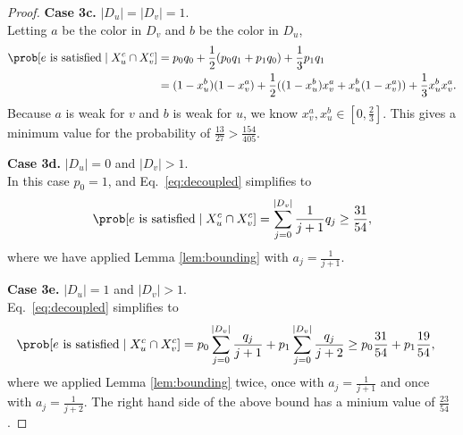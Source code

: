 \begin{proof}
	\bigbreak

	\noindent
	\textbf{Case 3c.} $|D_u| = |D_v| = 1$. \\
	Letting $a$ be the color in $D_v$ and $b$ be the color in $D_u$,
	\begin{align*}
		\prob[ e \text{ is satisfied} \mid X_u^c \cap X_v^c ] & = p_0 q_0 + \frac{1}{2}(p_0 q_1 + p_1 q_0) + \frac{1}{3} p_1 q_1 \\ &= (1 - x_u^b)(1 - x_v^a) + \frac{1}{2}((1 - x_u^b)x_v^a + x_u^b(1 - x_v^a)) + \frac{1}{3} x_u^b x_v^a.
	\end{align*}
	Because $a$ is weak for $v$ and $b$ is weak for $u$, we know $x_v^a, x_u^b \in [0, \frac{2}{3}]$. This gives a minimum value for the probability of $\frac{13}{27} > \frac{154}{405}$.

	\bigbreak

	\noindent
	\textbf{Case 3d.} $|D_u| = 0$ and $|D_v| > 1$. \\
	In this case $p_0 = 1$, and Eq.~\eqref{eq:decoupled} simplifies to
	\begin{equation*}
		\prob[ e \text{ is satisfied} \mid X_u^c \cap X_v^c ] = \sum_{j = 0}^{|D_v|} \frac{1}{j+1} q_j \geq \frac{31}{54},
	\end{equation*}
	where we have applied Lemma \ref{lem:bounding} with $a_j = \frac{1}{j+1}$.

	\bigbreak

	\noindent
	\textbf{Case 3e.} $|D_u| = 1$ and $|D_v| > 1$. \\
	Eq.~\eqref{eq:decoupled} simplifies to
	\begin{align*}
		\prob[ e \text{ is satisfied} \mid X_u^c \cap X_v^c ] & = p_0 \sum_{j = 0}^{|D_v|} \frac{q_j}{j+1}  + p_1 \sum_{j = 0}^{|D_v|} \frac{q_j}{j+2} \geq p_0 \frac{31}{54} + p_1 \frac{19}{54},
	\end{align*}
	where we applied Lemma \ref{lem:bounding} twice, once with $a_j = \frac{1}{j+1}$ and once with $a_j = \frac{1}{j+2}$. The right hand side of the above bound has a minium value of $\frac{23}{54}$.

	\bigbreak


\end{proof}
